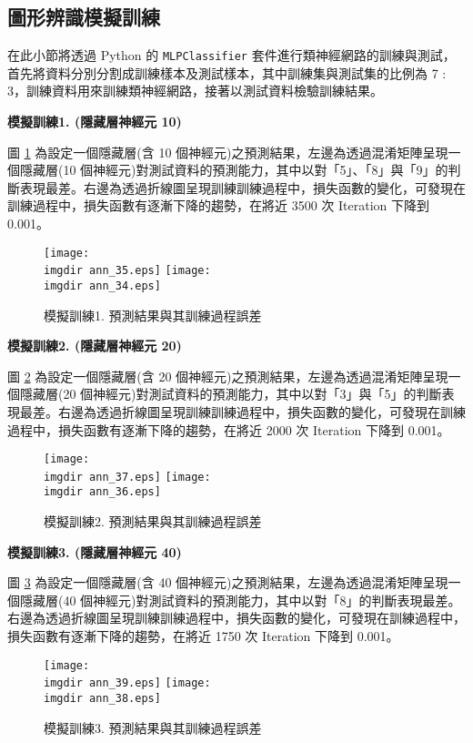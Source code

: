 \subsection{圖形辨識模擬訓練}

在此小節將透過 Python 的 \verb|MLPClassifier| 套件進行類神經網路的訓練與測試，首先將資料分別分割成訓練樣本及測試樣本，其中訓練集與測試集的比例為 7 : 3，訓練資料用來訓練類神經網路，接著以測試資料檢驗訓練結果。

\textbf{\large 模擬訓練1. (隱藏層神經元 10)}

圖 \ref{fig:ann_17} 為設定一個隱藏層(含 10 個神經元)之預測結果，左邊為透過混淆矩陣呈現一個隱藏層(10 個神經元)對測試資料的預測能力，其中以對「5」、「8」與「9」的判斷表現最差。右邊為透過折線圖呈現訓練訓練過程中，損失函數的變化，可發現在訓練過程中，損失函數有逐漸下降的趨勢，在將近 3500 次 Iteration 下降到 0.001。

\begin{figure}[H]
	\centering
	\texttt{[image: \\imgdir ann\_35.eps]}
	\texttt{[image: \\imgdir ann\_34.eps]}
	\caption{模擬訓練1. 預測結果與其訓練過程誤差}
	 \label{fig:ann_17}
\end{figure}

\textbf{\large 模擬訓練2. (隱藏層神經元 20)}

圖 \ref{fig:ann_18} 為設定一個隱藏層(含 20 個神經元)之預測結果，左邊為透過混淆矩陣呈現一個隱藏層(20 個神經元)對測試資料的預測能力，其中以對「3」與「5」的判斷表現最差。右邊為透過折線圖呈現訓練訓練過程中，損失函數的變化，可發現在訓練過程中，損失函數有逐漸下降的趨勢，在將近 2000 次 Iteration 下降到 0.001。

\begin{figure}[H]
	\centering
	\texttt{[image: \\imgdir ann\_37.eps]}
	\texttt{[image: \\imgdir ann\_36.eps]}
	\caption{模擬訓練2. 預測結果與其訓練過程誤差}
	 \label{fig:ann_18}
\end{figure}

\textbf{\large 模擬訓練3. (隱藏層神經元 40)}

圖 \ref{fig:ann_19} 為設定一個隱藏層(含 40 個神經元)之預測結果，左邊為透過混淆矩陣呈現一個隱藏層(40 個神經元)對測試資料的預測能力，其中以對「8」的判斷表現最差。右邊為透過折線圖呈現訓練訓練過程中，損失函數的變化，可發現在訓練過程中，損失函數有逐漸下降的趨勢，在將近 1750 次 Iteration 下降到 0.001。

\begin{figure}[H]
	\centering
	\texttt{[image: \\imgdir ann\_39.eps]}
	\texttt{[image: \\imgdir ann\_38.eps]}
	\caption{模擬訓練3. 預測結果與其訓練過程誤差}
	 \label{fig:ann_19}
\end{figure}

